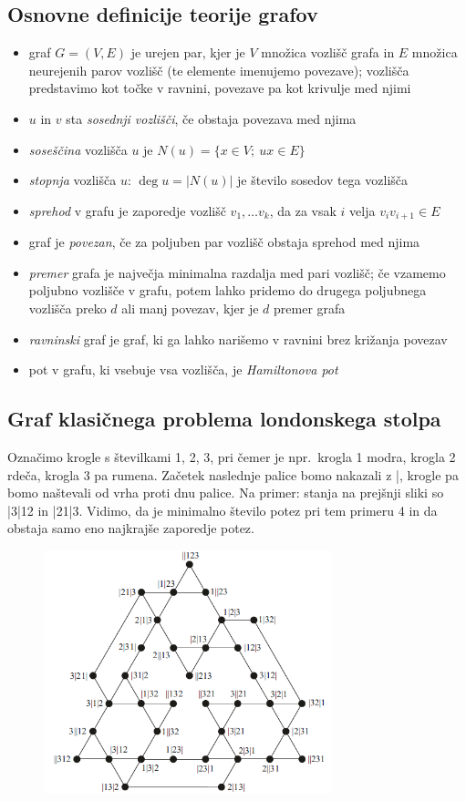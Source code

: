 \documentclass[11pt]{article}
\theoremstyle{definition} %
\theoremstyle{plain} %
\DeclareMathOperator {\stopnja} {deg}
\begin{document}
\subsection{Osnovne definicije teorije grafov}
\begin{itemize}
    \item graf $ G = (V, E) $ je urejen par, kjer je $V$ množica vozlišč grafa in $E$ množica neurejenih parov vozlišč (te elemente imenujemo povezave); vozlišča predstavimo kot točke v ravnini, povezave pa kot krivulje med njimi
    \item $u$ in $v$ sta \emph{sosednji vozlišči}, če obstaja povezava med njima
    \item \emph{soseščina} vozlišča $u$ je $N(u) = \{x \in V;\ ux \in E\}$
    \item \emph{stopnja} vozlišča $u$: $\stopnja u  = \lvert N(u) \rvert$ je število sosedov tega vozlišča
    \item \emph{sprehod} v grafu je zaporedje vozlišč $v_1,\ldots v_k$, da za vsak $i$ velja $v_i v_{i+1} \in E$
    \item graf je \emph{povezan}, če za poljuben par vozlišč obstaja sprehod med njima
    \item \emph{premer} grafa je največja minimalna razdalja med pari vozlišč; če vzamemo poljubno vozlišče v grafu, potem lahko pridemo do drugega poljubnega vozlišča preko $d$ ali manj povezav, kjer je $d$ premer grafa
    \item \emph{ravninski} graf je graf, ki ga lahko narišemo v ravnini brez križanja povezav
    \item pot v grafu, ki vsebuje vsa vozlišča, je \emph{Hamiltonova pot}
\end{itemize}


\subsection{Graf klasičnega problema londonskega stolpa}
Označimo krogle s številkami 1, 2, 3, pri čemer je npr.\ krogla 1 modra, krogla 2 rdeča, krogla 3 pa rumena. Začetek naslednje palice bomo nakazali z |, krogle pa bomo naštevali od vrha proti dnu palice.
Na primer: stanja na prejšnji sliki so |3|12 in |21|3.
Vidimo, da je minimalno število potez pri tem primeru 4 in da obstaja samo eno najkrajše zaporedje potez.
\begin{figure}[h]
    \centering
    \includegraphics[height=200pt]{img/tolgraph.png}
\end{figure}
\end{document}
